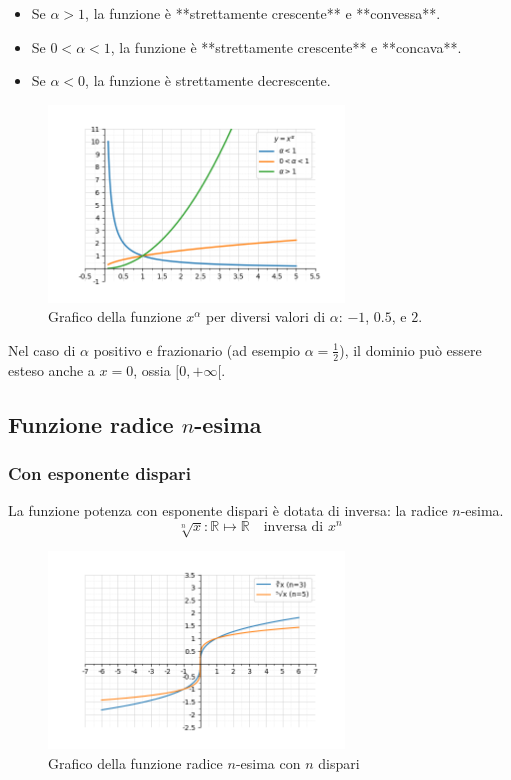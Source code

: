 \begin{itemize}
\item Se $\alpha > 1$, la funzione è **strettamente crescente** e **convessa**.
\item Se $0 < \alpha < 1$, la funzione è **strettamente crescente** e **concava**.
\item Se $\alpha < 0$, la funzione è strettamente decrescente.
\end{itemize}

\begin{figure}[H]
    \centering
    \includegraphics[width=0.7\textwidth]{./img/potenze_reali.png}
    \caption{Grafico della funzione $x^\alpha$ per diversi valori di $\alpha$: $-1$, $0.5$, e $2$.}
    \label{fig:potenze_reali}
\end{figure}
\FloatBarrier

Nel caso di $\alpha$ positivo e frazionario (ad esempio $\alpha = \frac{1}{2}$), il dominio può essere esteso anche a $x = 0$, ossia $[0, +\infty[$.


\subsection{Funzione radice $n$-esima}

\subsubsection{Con esponente dispari}
La funzione potenza con esponente dispari è dotata di inversa: la radice $n$-esima.
$$\sqrt[n]{x}: \mathbb{R} \mapsto \mathbb{R} \quad \text{inversa di } x^n$$

\begin{figure}[H]
    \centering
    \includegraphics[width=0.7\textwidth]{./img/radice_dispari.png}
    \caption{Grafico della funzione radice $n$-esima con $n$ dispari}
    \label{fig:radice_dispari}
\end{figure}
\FloatBarrier


